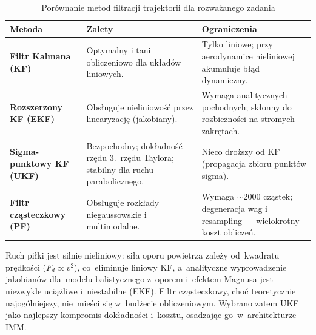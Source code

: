 \documentclass[14pt,a4paper]{extarticle}
\begin{document}
\begin{table}[H]
\centering
\caption{Porównanie metod filtracji trajektorii dla rozważanego zadania}
\label{tab:filtry}
\renewcommand{\arraystretch}{1.3}
\footnotesize
\begin{tabularx}{\textwidth}{>{\bfseries}p{2.6cm} X X}
\toprule
\rowcolor{vbHead}\textbf{Metoda} & \textbf{Zalety} & \textbf{Ograniczenia} \\
\midrule
Filtr Kalmana (KF) & Optymalny i tani obliczeniowo dla układów liniowych. &
  Tylko liniowe; przy aerodynamice nieliniowej akumuluje błąd dynamiczny. \\
Rozszerzony KF (EKF) & Obsługuje nieliniowość przez linearyzację (jakobiany). &
  Wymaga analitycznych pochodnych; skłonny do rozbieżności na stromych zakrętach. \\
Sigma-punktowy KF (UKF) & Bezpochodny; dokładność rzędu 3.~rzędu Taylora; stabilny dla ruchu parabolicznego. &
  Nieco droższy od KF (propagacja zbioru punktów sigma). \\
Filtr cząsteczkowy (PF) & Obsługuje rozkłady niegaussowskie i multimodalne. &
  Wymaga $\sim$2000 cząstek; degeneracja wag i resampling --- wielokrotny koszt obliczeń. \\
\bottomrule
\end{tabularx}
\end{table}

\noindent Ruch piłki jest silnie nieliniowy: siła oporu powietrza zależy od~kwadratu
prędkości ($F_d \propto v^2$), co~eliminuje liniowy KF, a~analityczne wyprowadzenie
jakobianów dla~modelu balistycznego z~oporem i~efektem Magnusa jest niezwykle uciążliwe
i~niestabilne (EKF). Filtr cząsteczkowy, choć teoretycznie najogólniejszy, nie~mieści się
w~budżecie obliczeniowym. Wybrano zatem UKF jako najlepszy kompromis dokładności
i~kosztu, osadzając go~w~architekturze IMM.
\end{document}
